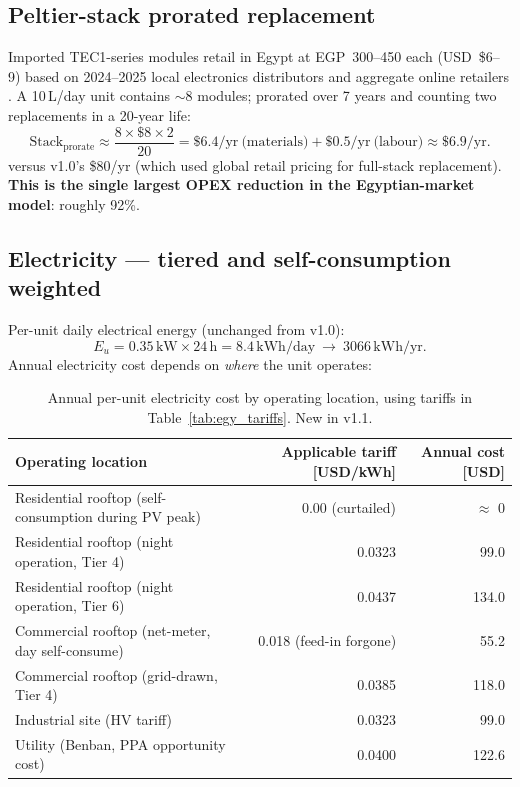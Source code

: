 \documentclass[11pt,a4paper]{article}
\begin{document}
\subsection{Peltier-stack prorated replacement}
Imported TEC1-series modules retail in Egypt at EGP~300--450 each (USD~\$6--9) based on 2024--2025 local electronics distributors and aggregate online retailers \citep{alibaba_awg_listings_2025,ram_electronics_egypt_2025}. A 10\,L/day unit contains $\sim$8 modules; prorated over 7 years and counting two replacements in a 20-year life:
\begin{equation}
\mathrm{Stack}_{\mathrm{prorate}} \approx \frac{8\times\$8\times 2}{20} = \$6.4/\mathrm{yr}\ \text{(materials)} + \$0.5/\mathrm{yr}\ \text{(labour)} \approx \$6.9/\mathrm{yr}.
\end{equation}
versus v1.0's \$80/yr (which used global retail pricing for full-stack replacement). \textbf{This is the single largest OPEX reduction in the Egyptian-market model}: roughly 92\%.

\subsection{Electricity --- tiered and self-consumption weighted}
Per-unit daily electrical energy (unchanged from v1.0):
\begin{equation}
E_u = 0.35\,\mathrm{kW}\times 24\,\mathrm{h} = 8.4\,\mathrm{kWh/day}\ \rightarrow\ 3066\,\mathrm{kWh/yr}.
\end{equation}
Annual electricity cost depends on \emph{where} the unit operates:
\begin{table}[h]
\centering\small
\caption{Annual per-unit electricity cost by operating location, using tariffs in Table~\ref{tab:egy_tariffs}. New in v1.1.}
\label{tab:egy_elec_cost}
\begin{tabular}{@{}lrr@{}}
\toprule
\textbf{Operating location} & \textbf{Applicable tariff [USD/kWh]} & \textbf{Annual cost [USD]}\\
\midrule
Residential rooftop (self-consumption during PV peak) & 0.00 (curtailed) & $\approx$ 0 \\
Residential rooftop (night operation, Tier 4)          & 0.0323 & 99.0 \\
Residential rooftop (night operation, Tier 6)          & 0.0437 & 134.0 \\
Commercial rooftop (net-meter, day self-consume)       & 0.018 (feed-in forgone) & 55.2 \\
Commercial rooftop (grid-drawn, Tier 4)                & 0.0385 & 118.0 \\
Industrial site (HV tariff)                             & 0.0323 & 99.0 \\
Utility (Benban, PPA opportunity cost)                  & 0.0400 & 122.6 \\
\bottomrule
\end{tabular}
\end{table}
\end{document}
